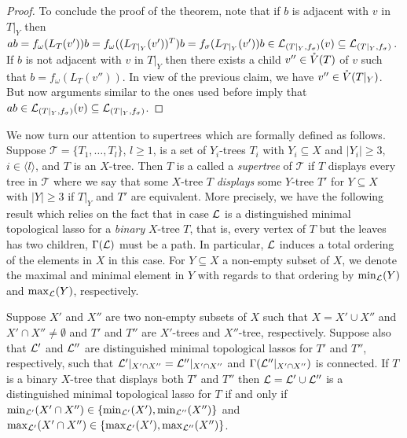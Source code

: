 \begin{proof}
To conclude the proof of the theorem, note that if $b$ is adjacent with $v$ in
$T|_Y$ then $ab= f_{\omega}(L_T(v'))b=f_{\omega}((L_{T|_Y}(v'))^T)b=
f_{\sigma}(L_{T|_Y}(v'))b\in{\mathcal L}_{(T|_Y,f_{\sigma})}(v) \subseteq
{\mathcal L}_{(T|_Y,f_{\sigma})}$.  If $b$ is not adjacent with $v$ in $T|_Y$ then
there exists a child $v''\in \mathring{V}(T)$ of $v$ such that
$b=f_{\omega}(L_T(v''))$.  In view of the previous claim, we have $v''\in
\mathring{V}(T|_Y)$.  But now arguments similar to the ones used before imply that
$ab\in {\mathcal L}_{(T|_Y,f_{\sigma})}(v)\subseteq {\mathcal L}_{(T|_Y,f_{\sigma})}$.
\end{proof}

We now turn our attention to supertrees which are formally defined as
follows. Suppose $\mathcal T=\{T_1,\ldots, T_l\}$, $l\geq 1$, is a set of
$Y_i$-trees $T_i$ with $Y_i\subseteq X$ and $|Y_i|\geq 3$, $i\in\langle
l\rangle$, and $T$ is an $X$-tree. Then $T$ is a called a {\em supertree} of
$\mathcal T $ if $T$ displays every tree in $\mathcal T$ where we say that
some $X$-tree $T$ {\em displays} some $Y$-tree $T'$ for $Y\subseteq X$ with
$|Y|\geq 3$ if $T|_Y$ and $T'$ are equivalent. More precisely, we have the
following result which relies on the fact that in case ${\mathcal L}$ is a
distinguished minimal topological lasso for a {\em binary} $X$-tree $T$, that
is, every vertex of $T$ but the leaves has two children, $\Gamma({\mathcal L})$ must be
a path. In particular, ${\mathcal L}$ induces a total ordering of the elements in $X$
in this case.  For $Y\subseteq X$ a non-empty subset of $X$, we denote the
maximal and minimal element in $Y$ with regards to that ordering by
$\min_{{\mathcal L}}(Y)$ and $\max_{{\mathcal L}}(Y)$, respectively.

\begin{cor}
  \label{cor:supertree}
  Suppose $X'$ and $X''$ are two non-empty subsets of $X$ such that $X=X'\cup
  X''$ and $X'\cap X''\not=\emptyset$ and $T'$ and $T''$ are $X'$-trees and
  $X''$-tree, respectively. Suppose also that ${\mathcal L}'$ and ${\mathcal L}''$ are
  distinguished minimal topological lassos for $T'$ and $T''$, respectively,
  such that ${\mathcal L}'|_{X'\cap X''} ={\mathcal L}''|_{X'\cap X''}$ and
  $\Gamma({\mathcal L}''|_{X'\cap X''})$ is connected.
  If $T$ is a binary $X$-tree that displays both $T'$ and $T''$ then
  ${\mathcal L}={\mathcal L}'\cup{\mathcal L}''$ is a distinguished minimal topological lasso for $T$ if
  and only if $\min_{{\mathcal L}'}(X'\cap X'')\in \{\min_{{\mathcal L}'}(X'),
  \min_{{\mathcal L}''}(X'')\}$ and $\max_{{\mathcal L}'}(X'\cap X'')\in \{\max_{{\mathcal L}'}(X'),
  \max_{{\mathcal L}''}(X'')\}$.
\end{cor}

